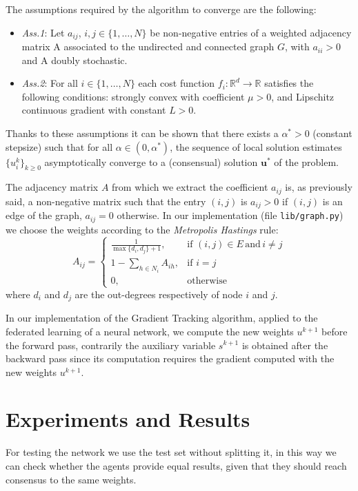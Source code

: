 \documentclass[a4paper,11pt,oneside]{book}
\begin{document}
\bigskip
The assumptions required by the algorithm to converge are the following:
\begin{itemize}
\item \textit{Ass.1}: Let  $a_{ij}$, $i,j \in \{1, \ldots, N\}$ be non-negative entries of a weighted adjacency matrix A associated to the undirected and connected graph $G$, with $a_{ii}>0$ and A doubly stochastic.
\item \textit{Ass.2}: For all $i \in \{1, \ldots, N\}$ each cost function $f_i: \mathbb{R}^d \to \mathbb{R}$ satisfies the following conditions: strongly convex with coefficient $\mu >0$, and Lipschitz continuous gradient with constant $L>0$.
\end{itemize}
Thanks to these assumptions it can be shown that there exists a $\alpha^*>0$ (constant stepsize) such that for all $\alpha \in (0,\alpha^*)$, the sequence of local solution estimates $\{u_i^k\}_{k\geq0}$ asymptotically converge to a (consensual) solution $\textbf{u}^*$ of the problem.

\bigskip
The adjacency matrix $A$ from which we extract the coefficient $a_{ij}$ is, as previously said, a non-negative matrix such that the entry $(i,j)$ is $a_{ij}>0$ if $(i,j)$ is an edge of the graph, $a_{ij}=0$ otherwise.
In our implementation (file \texttt{lib/graph.py}) we choose the weights according to the \textit{Metropolis Hastings} rule:
\begin{equation}
A_{ij} = 
\begin{cases}
\frac{1}{\max\{d_i,d_j\}+1},  &\text{if } (i,j) \in E\, \text{and}\, i \neq j \\
1-\sum_{h \in N_i} A_{ih}, &\text{if }  i=j \\
0, &\text{otherwise}
\end{cases}
\end{equation}
where $d_i$ and $d_j$ are the out-degrees respectively of node $i$ and $j$.

\bigskip
In our implementation of the Gradient Tracking algorithm, applied to the federated learning of a neural network,  we compute the new weights $u^{k+1}$ before the forward pass, contrarily the auxiliary variable $s^{k+1}$ is obtained after the backward pass since its computation requires the gradient computed with the new weights $u^{k+1}$.

\section{Experiments and Results}
For testing the network we use the test set without splitting it, in this way we can check whether the agents provide equal results, given that they should reach consensus to the same weights. 
\end{document}
